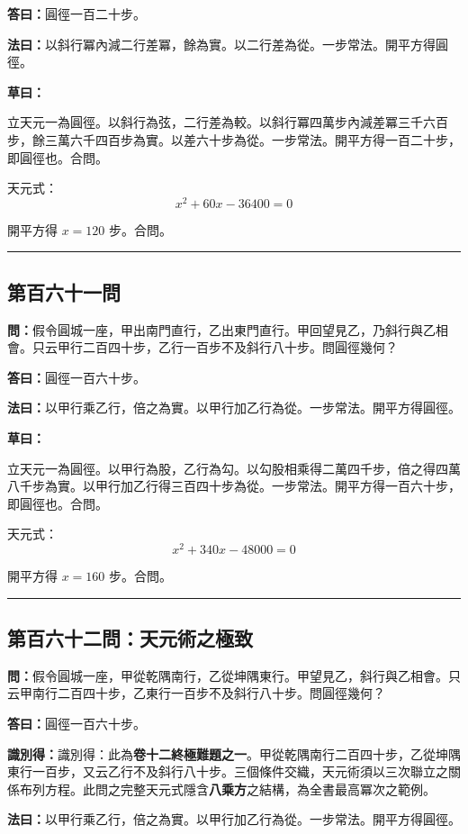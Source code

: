 \documentclass[11pt,a4paper]{article}
\newcommand{\longline}{\noindent\rule{\textwidth}{0.4pt}}
\newcommand{\wen}[1]{\par\noindent\textbf{\textcolor{probcolor}{問：}}{#1}\par}
\newcommand{\da}[1]{\par\noindent\textbf{\textcolor{anscolor}{答曰：}}{#1}\par}
\newcommand{\fayue}[1]{\par\noindent\textbf{\textcolor{methodcolor}{法曰：}}{#1}\par}
\newcommand{\caoyue}[1]{\par\noindent\textbf{草曰：}{#1}\par}
\newcommand{\zhi}[1]{\par\noindent\textbf{識別得：}{#1}\par}
\begin{document}
\da{圓徑一百二十步。}

\fayue{以斜行冪內減二行差冪，餘為實。以二行差為從。一步常法。開平方得圓徑。}

\caoyue{
立天元一為圓徑。以斜行為弦，二行差為較。以斜行冪四萬步內減差冪三千六百步，餘三萬六千四百步為實。以差六十步為從。一步常法。開平方得一百二十步，即圓徑也。合問。

天元式：
$$x^2 + 60x - 36400 = 0$$

開平方得 $x = 120$ 步。合問。
}

\vspace{0.5cm}
\longline

\subsection*{第百六十一問}
\wen{假令圓城一座，甲出南門直行，乙出東門直行。甲回望見乙，乃斜行與乙相會。只云甲行二百四十步，乙行一百步不及斜行八十步。問圓徑幾何？}

\da{圓徑一百六十步。}

\fayue{以甲行乘乙行，倍之為實。以甲行加乙行為從。一步常法。開平方得圓徑。}

\caoyue{
立天元一為圓徑。以甲行為股，乙行為勾。以勾股相乘得二萬四千步，倍之得四萬八千步為實。以甲行加乙行得三百四十步為從。一步常法。開平方得一百六十步，即圓徑也。合問。

天元式：
$$x^2 + 340x - 48000 = 0$$

開平方得 $x = 160$ 步。合問。
}

\vspace{0.5cm}
\longline

\subsection*{第百六十二問：天元術之極致}
\wen{假令圓城一座，甲從乾隅南行，乙從坤隅東行。甲望見乙，斜行與乙相會。只云甲南行二百四十步，乙東行一百步不及斜行八十步。問圓徑幾何？}

\da{圓徑一百六十步。}

\zhi{識別得：此為\textbf{卷十二終極難題之一}。甲從乾隅南行二百四十步，乙從坤隅東行一百步，又云乙行不及斜行八十步。三個條件交織，天元術須以三次聯立之關係布列方程。此問之完整天元式隱含\textbf{八乘方}之結構，為全書最高冪次之範例。}

\fayue{以甲行乘乙行，倍之為實。以甲行加乙行為從。一步常法。開平方得圓徑。}
\end{document}
